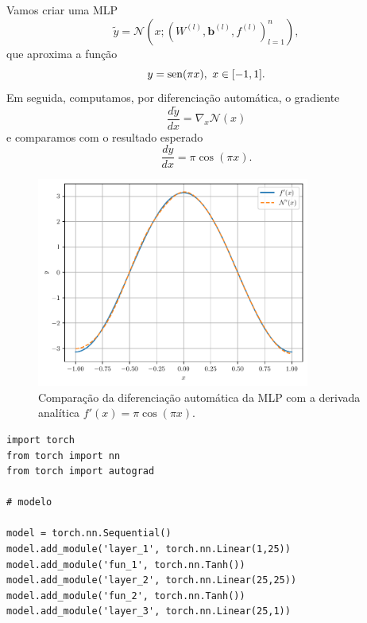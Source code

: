 \begin{ex}\label{ex_mlp_autograd_apfun1d}
  Vamos criar uma MLP
  \begin{equation}
    \tilde{y} = \mathcal{N}\left(x; \left(W^{(l)}, \pmb{b}^{(l)}, f^{(l)}\right)_{l=1}^{n}\right),
  \end{equation}
  que aproxima a função
  \begin{equation}
    y = \operatorname{sen}(\pi x), ~x\in [-1, 1].
  \end{equation}
  Em seguida, computamos, por diferenciação automática, o gradiente
  \begin{equation}
    \frac{d\tilde{y}}{dx} = \nabla_x\mathcal{N}(x)
  \end{equation}
  e comparamos com o resultado esperado
  \begin{equation}
    \frac{dy}{dx} = \pi\cos(\pi x).
  \end{equation}

  \begin{figure}[H]
    \centering
    \includegraphics[width=0.8\textwidth]{cap_mlp/dados/ex_mlp_autograd_apfun1d/fig}
    \caption{Comparação da diferenciação automática da MLP com a derivada analítica $f'(x)=\pi\cos(\pi x)$.}
    \label{fig:mlp_autograd_apfun1d}
  \end{figure}
  
\begin{lstlisting}[caption=mlp\_autograd\_apfun1d.py]
import torch
from torch import nn
from torch import autograd

# modelo

model = torch.nn.Sequential()
model.add_module('layer_1', torch.nn.Linear(1,25))
model.add_module('fun_1', torch.nn.Tanh())
model.add_module('layer_2', torch.nn.Linear(25,25))
model.add_module('fun_2', torch.nn.Tanh())
model.add_module('layer_3', torch.nn.Linear(25,1))


\end{lstlisting}
\end{ex}
